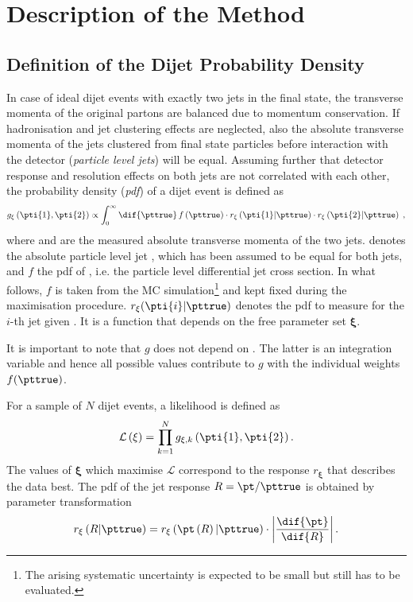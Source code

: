 

\section{Description of the Method}\label{sec:ResFit:Method}

\subsection{Definition of the Dijet Probability Density}
In case of ideal dijet events with exactly two jets in the final
state, the transverse momenta of the original partons are balanced due
to momentum conservation.
If hadronisation and jet clustering effects are neglected, also
the absolute transverse momenta of the jets clustered from final state
particles before interaction with the detector (\textit{particle level
  jets}) will be equal.
Assuming further that detector response and resolution effects on both jets are not correlated with each other, the probability density (\textit{pdf}) of a dijet event is defined as
\begin{equation}
  \label{eq:ResFit:DijetPdf}
  g_{\mathbf{\xi}}\left(\pti{1},\pti{2}\right) \propto \int^{\infty}_{0}\dif{\pttrue}\,f\left(\pttrue\right)
  \cdot r_{\mathbf{\xi}}\left(\pti{1}|\pttrue\right)
  \cdot r_{\mathbf{\xi}}\left(\pti{2}|\pttrue\right) \; ,
\end{equation}
where  and  are the measured absolute transverse momenta of
the two jets.
\pttrue denotes the absolute particle level jet \pt, which has been assumed to
be equal for both jets, and  $f$ the pdf of \pttrue, i.e. the particle level differential jet 
cross section.
In what follows, $f$ is taken from the MC
simulation\footnote{The arising systematic uncertainty is expected to
  be small but still has to be evaluated.}
and kept fixed during the maximisation procedure.
$r_{\mathbf{\xi}}(\pti{i}|\pttrue)$ denotes the pdf to measure  for the
$i$-th jet given \pttrue.
It is a function that depends on the free parameter set $\mathbf{\xi}$.

It is important to note that $g$ does not depend on \pttrue.
The latter is an integration variable and hence all possible values
contribute to $g$ with the individual weights $f(\pttrue)$.

For a sample of $N$ dijet events, a likelihood is defined as
\begin{equation}
  \label{eq:ResFit:Likelihood}
  \mathcal{L}\left(\mathbf{\xi}\right) = \prod^{N}_{k=1} g_{\mathbf{\xi},k}\left(\pti{1},\pti{2}\right).
\end{equation}
The values of $\mathbf{\xi}$ which maximise $\mathcal{L}$ correspond
to the response $r_{\mathbf{\xi}}$ that describes the data best.
The pdf of the jet \pt response \mbox{$R = \pt / \pttrue$} is obtained by parameter transformation
\begin{equation*}
  r_{\mathbf{\xi}}\left(R|\pttrue\right) =
  r_{\mathbf{\xi}}\left(\pt\left(R\right)|\pttrue\right)\cdot\left|\frac{\dif{\pt}}{\dif{R}}\right|.
\end{equation*}



